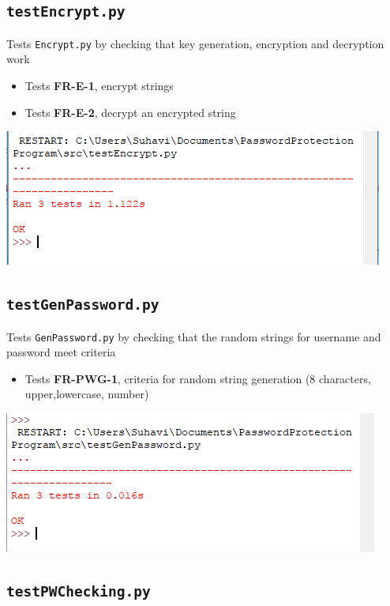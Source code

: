 \documentclass[12pt, titlepage]{article}
\begin{document}
	\subsection{\texttt{testEncrypt.py}}
	
		Tests \texttt{Encrypt.py} by checking that key generation, encryption and decryption work

		\begin{itemize}
			\item Tests \textbf{FR-E-1}, encrypt strings
			\item Tests \textbf{FR-E-2}, decrypt an encrypted string
		\end{itemize}

		\includegraphics[scale=1]{testEncrypt.png}

	\subsection{\texttt{testGenPassword.py}}

		Tests \texttt{GenPassword.py} by checking that the random strings for username and password meet criteria

		\begin{itemize}
			\item Tests \textbf{FR-PWG-1}, criteria for random string generation (8 characters, upper,lowercase, number)
		\end{itemize}

		\includegraphics[scale=1]{testGenPassword.png}

	\subsection{\texttt{testPWChecking.py}}
	
\end{document}
